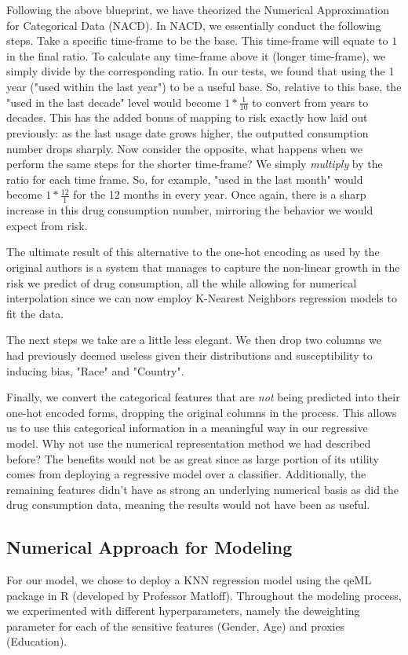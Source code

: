 \documentclass{article}
\begin{document}
    Following the above blueprint, we have theorized the Numerical Approximation for Categorical Data (NACD). In NACD, we essentially conduct the following steps. Take a specific time-frame to be the base. This time-frame will equate to $1$ in the final ratio. To calculate any time-frame above it (longer time-frame), we simply divide by the corresponding ratio. In our tests, we found that using the 1 year ("used within the last year") to be a useful base. So, relative to this base, the "used in the last decade" level would become $1 * \frac{1}{10}$ to convert from years to decades. This has the added bonus of mapping to risk exactly how laid out previously: as the last usage date grows higher, the outputted consumption number drops sharply. Now consider the opposite, what happens when we perform the same steps for the shorter time-frame? We simply \textit{multiply} by the ratio for each time frame. So, for example, "used in the last month" would become $1 * \frac{12}{1}$ for the 12 months in every year. Once again, there is a sharp increase in this drug consumption number, mirroring the behavior we would expect from risk.

    The ultimate result of this alternative to the one-hot encoding as used by the original authors is a system that manages to capture the non-linear growth in the risk we predict of drug consumption, all the while allowing for numerical interpolation since we can now employ K-Nearest Neighbors regression models to fit the data.

    The next steps we take are a little less elegant. We then drop two columns we had previously deemed useless given their distributions and susceptibility to inducing bias, "Race" and "Country".
    
    Finally, we convert the categorical features that are \textit{not} being predicted into their one-hot encoded forms, dropping the original columns in the process. This allows us to use this categorical information in a meaningful way in our regressive model. Why not use the numerical representation method we had described before? The benefits would not be as great since as large portion of its utility comes from deploying a regressive model over a classifier. Additionally, the remaining features didn't have as strong an underlying numerical basis as did the drug consumption data, meaning the results would not have been as useful.


    \subsection{Numerical Approach for Modeling}
    For our model, we chose to deploy a KNN regression model using the qeML package in R (developed by Professor Matloff). Throughout the modeling process, we experimented with different hyperparameters, namely the deweighting parameter for each of the sensitive features (Gender, Age) and proxies (Education).
\end{document}
